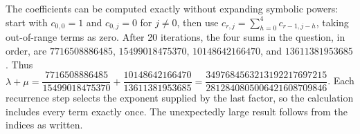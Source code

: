 The coefficients can be computed exactly without expanding symbolic powers: start with $c_{0,0}=1$ and $c_{0,j}=0$ for $j\ne0$, then use $c_{r,j}=\sum_{h=0}^4c_{r-1,j-h}$, taking out-of-range terms as zero. After 20 iterations, the four sums in the question, in order, are $7716508886485$, $15499018475370$, $10148642166470$, and $13611381953685$. Thus $\lambda + \mu = \dfrac{7716508886485}{15499018475370} + \dfrac{10148642166470}{13611381953685} = \boxed{\dfrac{3497684563213192217697215}{2812840805006421608709846}}$. Each recurrence step selects the exponent supplied by the last factor, so the calculation includes every term exactly once. The unexpectedly large result follows from the indices as written.
